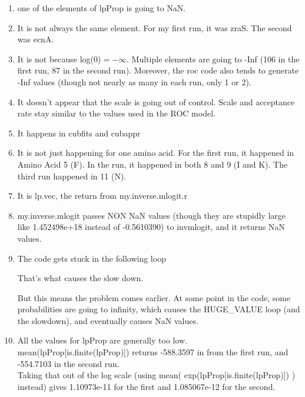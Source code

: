 \begin{enumerate}
\item one of the elements of lpProp is going to NaN.
\item It is not always the same element. For my first run, it was zraS. The second was ecnA.
\item It is not because log(0)$= -\infty$. Multiple elements are going to -Inf (106 in the first run,  87 in the second run). Moreover, the roc code also tends to generate -Inf values (though not nearly as many in each run, only 1 or 2).
\item It doesn't appear that the scale is going out of control. Scale and acceptance rate stay similar to the values used in the ROC model.
\item It happens in cubfits and cubappr 
\item It is not just happening for one amino acid. For the first run, it happened in Amino Acid 5 (F). In the run, it happened in both 8 and 9 (I and K). The third run happened in 11 (N).
\item It is lp.vec, the return from my.inverse.mlogit.r
\item my.inverse.mlogit passes NON NaN values (though they are stupidly large like 1.452498e+18 instead of -0.5610390) to invmlogit, and it returns NaN values.
\item The code gets stuck in the following loop



That's what causes the slow down.

But this means the problem comes earlier. At some point in the code, some probabilities are going to infinity, which causes the HUGE\_VALUE loop (and the slowdown), and eventually causes NaN values.


\item All the values for lpProp are generally too low.\\
mean(lpProp[is.finite(lpProp)]) returns -588.3597 in from the first run, and -554.7103 in the second run.\\

Taking that out of the log scale (using mean( exp(lpProp[is.finite(lpProp)]) ) instead) gives 1.10973e-11 for the first and 1.085067e-12 for the second.




\end{enumerate}
